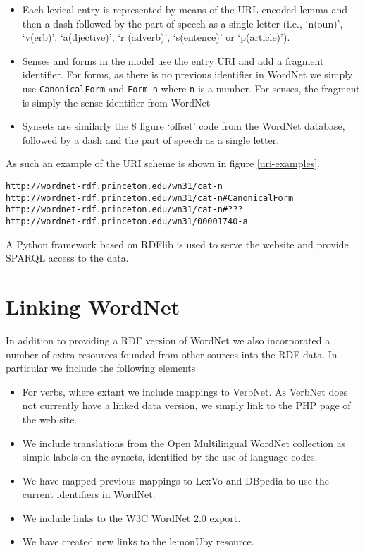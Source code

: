 \documentclass[10pt, a4paper]{article}
\begin{document}
\begin{itemize}
  \item Each lexical entry is represented by means of the URL-encoded lemma and
    then a dash followed by the part of speech as a single letter (i.e., `n(oun)',
    `v(erb)', `a(djective)', `r (adverb)', `s(entence)' or `p(article)').
  \item Senses and forms in the model use the entry URI and add a fragment
    identifier. For forms, as there is no previous identifier in WordNet we
    simply use {\tt CanonicalForm} and {\tt Form-n} where {\tt n} is a number.
    For senses, the fragment is simply the sense identifier from WordNet
  \item Synsets are similarly the 8 figure `offset' code from the WordNet
    database, followed by a dash and the part of speech as a single letter.
\end{itemize}

As such an example of the URI scheme is shown in figure \ref{uri-examples}.

\begin{figure*}
\begin{verbatim}
http://wordnet-rdf.princeton.edu/wn31/cat-n
http://wordnet-rdf.princeton.edu/wn31/cat-n#CanonicalForm
http://wordnet-rdf.princeton.edu/wn31/cat-n#???
http://wordnet-rdf.princeton.edu/wn31/00001740-a
\end{verbatim}
\end{figure*}

A Python framework based on RDFlib\cite{} is used to serve the website and
provide SPARQL access to the data.

\section{Linking WordNet}

In addition to providing a RDF version of WordNet we also incorporated a number
of extra resources founded from other sources into the RDF data. In particular
we include the following elements

\begin{itemize}
  \item For verbs, where extant we include mappings to VerbNet\cite{}. As
    VerbNet does not currently have a linked data version, we simply link to the
    PHP page of the web site.
  \item We include translations from the Open Multilingual WordNet\cite{}
    collection as simple labels on the synsets, identified by the use of
    language codes.
  \item We have mapped previous mappings to LexVo\cite{} and DBpedia\cite{} to
    use the current identifiers in WordNet.
  \item We include links to the W3C WordNet 2.0 export\cite{}.
  \item We have created new links to the lemonUby\cite{} resource.
\end{itemize}
\end{document}
